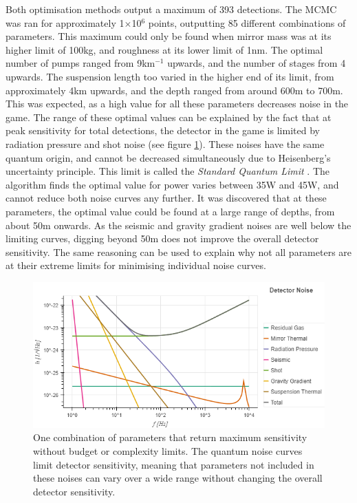 \documentclass{article}
\begin{document}
Both optimisation methods output a maximum of 393 detections. The MCMC was ran for approximately 1$\times$10$^6$ points, outputting 85 different combinations of parameters. This maximum could only be found when mirror mass was at its higher limit of 100kg, and roughness at its lower limit of 1nm. The optimal number of pumps ranged from 9km$^{-1}$ upwards, and the number of stages from 4 upwards. The suspension length too varied in the higher end of its limit, from approximately 4km upwards, and the depth ranged from around 600m to 700m. This was expected, as a high value for all these parameters decreases noise in the game. The range of these optimal values can be explained by the fact that at peak sensitivity for total detections, the detector in the game is limited by radiation pressure and shot noise (see figure \ref{fig::SPQMaxNoLim}). These noises have the same quantum origin, and cannot be decreased simultaneously due to Heisenberg's uncertainty principle. This limit is called the \textit{Standard Quantum Limit} \cite{danilishin}. The algorithm finds the optimal value for power varies between 35W and 45W, and cannot reduce both noise curves any further. It was discovered that at these parameters, the optimal value could be found at a large range of depths, from about 50m onwards. As the seismic and gravity gradient noises are well below the limiting curves, digging beyond 50m does not improve the overall detector sensitivity. The same reasoning can be used to explain why not all parameters are at their extreme limits for minimising individual noise curves. 

\begin{figure}[h!]
    \centering
    \includegraphics[scale=0.55]{SPQMaxNoLim.png}
    \captionsetup{width=0.9\textwidth}
    \caption{One combination of parameters that return maximum sensitivity without budget or complexity limits. The quantum noise curves limit detector sensitivity, meaning that parameters not included in these noises can vary over a wide range without changing the overall detector sensitivity.}
    \label{fig::SPQMaxNoLim}
\end{figure}
\end{document}
